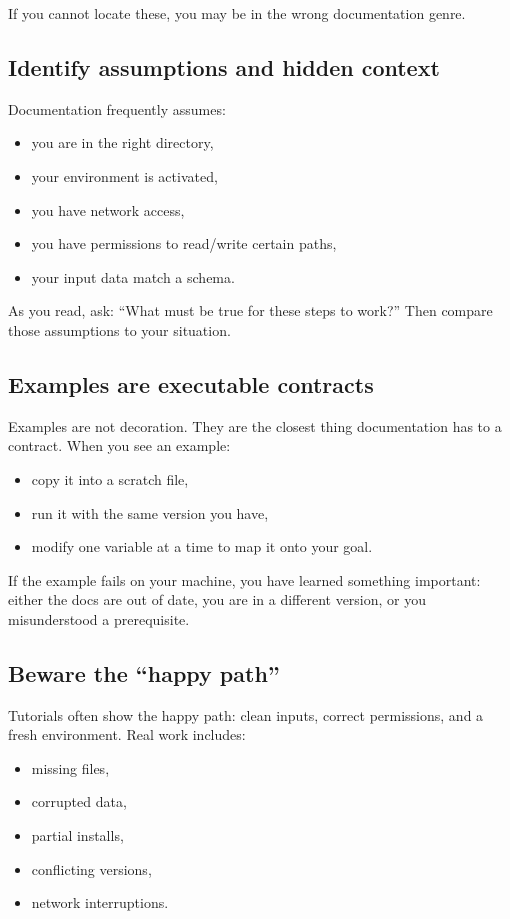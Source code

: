 If you cannot locate these, you may be in the wrong documentation genre.

\subsection{Identify assumptions and hidden context}
Documentation frequently assumes:
\begin{itemize}[noitemsep]
  \item you are in the right directory,
  \item your environment is activated,
  \item you have network access,
  \item you have permissions to read/write certain paths,
  \item your input data match a schema.
\end{itemize}

As you read, ask: “What must be true for these steps to work?” Then compare those assumptions to your situation.

\subsection{Examples are executable contracts}
Examples are not decoration. They are the closest thing documentation has to a contract. When you see an example:
\begin{itemize}[noitemsep]
  \item copy it into a scratch file,
  \item run it with the same version you have,
  \item modify one variable at a time to map it onto your goal.
\end{itemize}

If the example fails on your machine, you have learned something important: either the docs are out of date, you are in a different version, or you misunderstood a prerequisite.

\subsection{Beware the “happy path”}
Tutorials often show the happy path: clean inputs, correct permissions, and a fresh environment. Real work includes:
\begin{itemize}[noitemsep]
  \item missing files,
  \item corrupted data,
  \item partial installs,
  \item conflicting versions,
  \item network interruptions.
\end{itemize}

